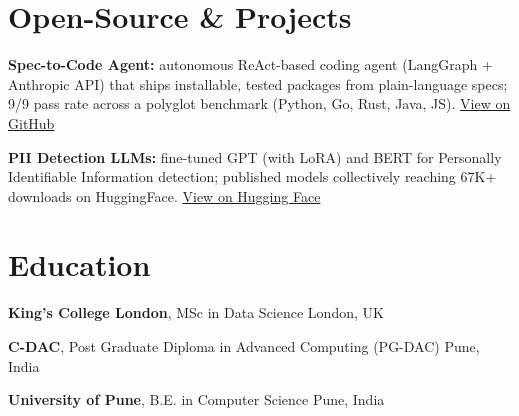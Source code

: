 \documentclass[10pt,a4paper]{article}
\begin{document}
\section{Open-Source \& Projects}
\begin{tight}
  \item \textbf{Spec-to-Code Agent:} autonomous ReAct-based coding agent (LangGraph + Anthropic API) that ships installable, tested packages from plain-language specs; 9/9 pass rate across a polyglot benchmark (Python, Go, Rust, Java, JS). \href{https://github.com/abhijeetscode/Spec-to-Code-Agent}{View on GitHub}
  \item \textbf{PII Detection LLMs:} fine-tuned GPT (with LoRA) and BERT for Personally Identifiable Information detection; published models collectively reaching 67K+ downloads on HuggingFace. \href{https://huggingface.co/ab-ai/pii_model}{View on Hugging Face}
\end{tight}

\section{Education}
\begin{tight}
  \item[\textcolor{accent}{\small$\bullet$}] {\color{company}\bfseries King's College London}, MSc in Data Science \hfill {\color{muted}London, UK}
  \item[\textcolor{accent}{\small$\bullet$}] {\color{company}\bfseries C-DAC}, Post Graduate Diploma in Advanced Computing (PG-DAC) \hfill {\color{muted}Pune, India}
  \item[\textcolor{accent}{\small$\bullet$}] {\color{company}\bfseries University of Pune}, B.E. in Computer Science \hfill {\color{muted}Pune, India}
\end{tight}
\end{document}
